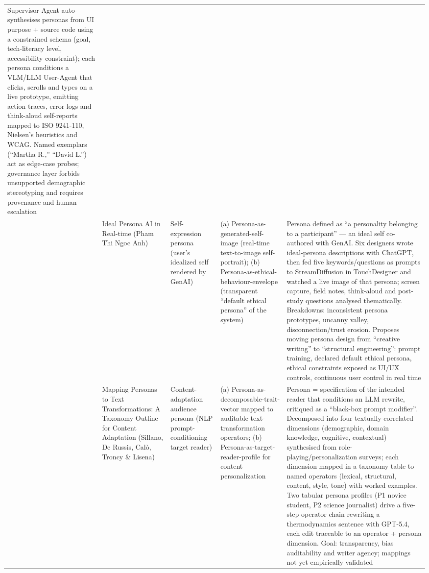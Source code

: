 \begin{table}[t]
\begin{tabular}{p{0.5cm} p{3.6cm} p{3.4cm} p{3.6cm} p{3.6cm}}
Supervisor-Agent auto-synthesises personas from UI purpose + source code using a constrained schema (goal, tech-literacy level, accessibility constraint); each persona conditions a VLM/LLM User-Agent that clicks, scrolls and types on a live prototype, emitting action traces, error logs and think-aloud self-reports mapped to ISO 9241-110, Nielsen's heuristics and WCAG. Named exemplars (``Martha R.,'' ``David L.'') act as edge-case probes; governance layer forbids unsupported demographic stereotyping and requires provenance and human escalation \\
\addlinespace
5 & Ideal Persona AI in Real-time (Pham Thi Ngoc Anh) &
Self-expression persona (user's idealized self rendered by GenAI) &
(a) Persona-as-generated-self-image (real-time text-to-image self-portrait); (b) Persona-as-ethical-behaviour-envelope (transparent ``default ethical persona'' of the system) &
Persona defined as ``a personality belonging to a participant'' --- an ideal self co-authored with GenAI. Six designers wrote ideal-persona descriptions with ChatGPT, then fed five keywords/questions as prompts to StreamDiffusion in TouchDesigner and watched a live image of that persona; screen capture, field notes, think-aloud and post-study questions analysed thematically. Breakdowns: inconsistent persona prototypes, uncanny valley, disconnection/trust erosion. Proposes moving persona design from ``creative writing'' to ``structural engineering'': prompt training, declared default ethical persona, ethical constraints exposed as UI/UX controls, continuous user control in real time \\
\addlinespace
6 & Mapping Personas to Text Transformations: A Taxonomy Outline for Content Adaptation (Sillano, De Russis, Cal\`o, Troncy \& Lisena) &
Content-adaptation audience persona (NLP prompt-conditioning target reader) &
(a) Persona-as-decomposable-trait-vector mapped to auditable text-transformation operators; (b) Persona-as-target-reader-profile for content personalization &
Persona = specification of the intended reader that conditions an LLM rewrite, critiqued as a ``black-box prompt modifier''. Decomposed into four textually-correlated dimensions (demographic, domain knowledge, cognitive, contextual) synthesised from role-playing/personalization surveys; each dimension mapped in a taxonomy table to named operators (lexical, structural, content, style, tone) with worked examples. Two tabular persona profiles (P1 novice student, P2 science journalist) drive a five-step operator chain rewriting a thermodynamics sentence with GPT-5.4, each edit traceable to an operator + persona dimension. Goal: transparency, bias auditability and writer agency; mappings not yet empirically validated \\
\bottomrule
\end{tabular}
\end{table}
